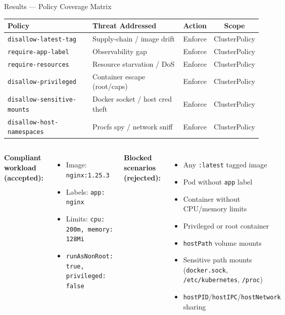 \documentclass[aspectratio=169,10pt]{beamer}
\begin{document}
\begin{frame}{Results — Policy Coverage Matrix}
  \begin{center}
  \renewcommand{\arraystretch}{1.35}
  \begin{tabular}{lllc}
    \toprule
    \textbf{Policy} & \textbf{Threat Addressed} & \textbf{Action} & \textbf{Scope} \\
    \midrule
    \texttt{disallow-latest-tag}      & Supply-chain / image drift        & Enforce & ClusterPolicy \\
    \texttt{require-app-label}        & Observability gap                 & Enforce & ClusterPolicy \\
    \texttt{require-resources}        & Resource starvation / DoS         & Enforce & ClusterPolicy \\
    \texttt{disallow-privileged}      & Container escape (root/caps)      & Enforce & ClusterPolicy \\
    \texttt{disallow-sensitive-mounts}& Docker socket / host cred theft   & Enforce & ClusterPolicy \\
    \texttt{disallow-host-namespaces} & Procfs spy / network sniff        & Enforce & ClusterPolicy \\
    \bottomrule
  \end{tabular}
  \end{center}

  \vspace{6pt}
  \begin{columns}[T]
      \textbf{Compliant workload (accepted):}
      \begin{itemize}
        \item Image: \texttt{nginx:1.25.3}
        \item Labels: \texttt{app: nginx}
        \item Limits: \texttt{cpu: 200m, memory: 128Mi}
        \item \texttt{runAsNonRoot: true, privileged: false}
      \end{itemize}
      \textbf{Blocked scenarios (rejected):}
      \begin{itemize}
        \item Any \texttt{:latest} tagged image
        \item Pod without \texttt{app} label
        \item Container without CPU/memory limits
        \item Privileged or root container
        \item \texttt{hostPath} volume mounts
        \item Sensitive path mounts (\texttt{docker.sock}, \texttt{/etc/kubernetes}, \texttt{/proc})
        \item \texttt{hostPID}/\texttt{hostIPC}/\texttt{hostNetwork} sharing
      \end{itemize}
  \end{columns}
\end{frame}
\end{document}
